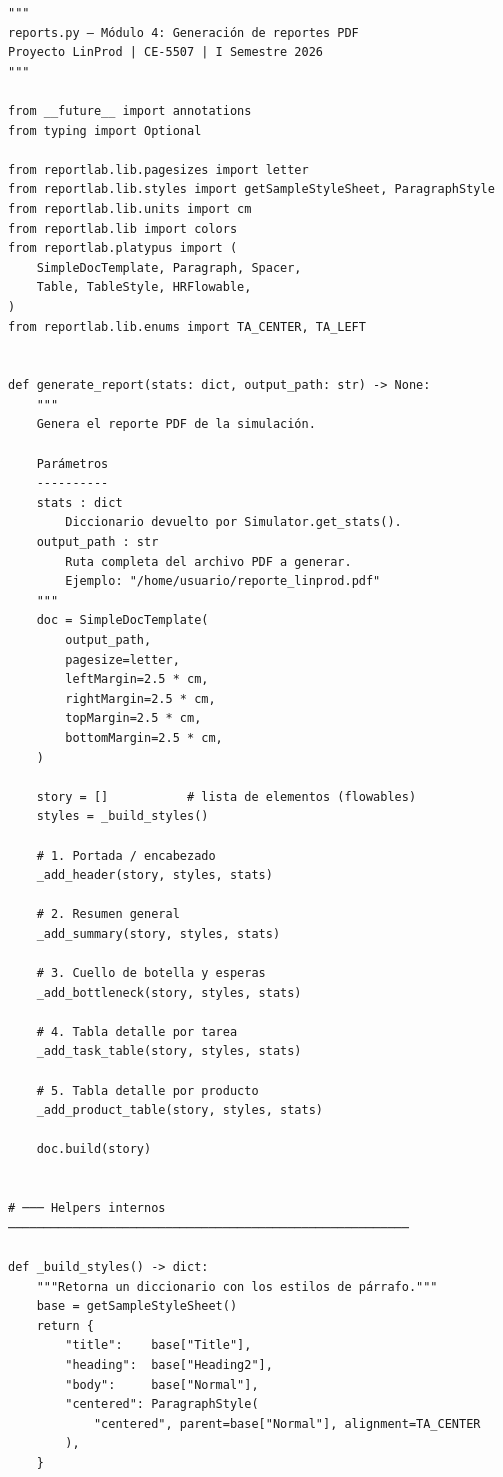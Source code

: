 \documentclass[12pt,letterpaper]{article}
\begin{document}
\begin{lstlisting}
"""
reports.py — Módulo 4: Generación de reportes PDF
Proyecto LinProd | CE-5507 | I Semestre 2026
"""

from __future__ import annotations
from typing import Optional

from reportlab.lib.pagesizes import letter
from reportlab.lib.styles import getSampleStyleSheet, ParagraphStyle
from reportlab.lib.units import cm
from reportlab.lib import colors
from reportlab.platypus import (
    SimpleDocTemplate, Paragraph, Spacer,
    Table, TableStyle, HRFlowable,
)
from reportlab.lib.enums import TA_CENTER, TA_LEFT


def generate_report(stats: dict, output_path: str) -> None:
    """
    Genera el reporte PDF de la simulación.

    Parámetros
    ----------
    stats : dict
        Diccionario devuelto por Simulator.get_stats().
    output_path : str
        Ruta completa del archivo PDF a generar.
        Ejemplo: "/home/usuario/reporte_linprod.pdf"
    """
    doc = SimpleDocTemplate(
        output_path,
        pagesize=letter,
        leftMargin=2.5 * cm,
        rightMargin=2.5 * cm,
        topMargin=2.5 * cm,
        bottomMargin=2.5 * cm,
    )

    story = []           # lista de elementos (flowables)
    styles = _build_styles()

    # 1. Portada / encabezado
    _add_header(story, styles, stats)

    # 2. Resumen general
    _add_summary(story, styles, stats)

    # 3. Cuello de botella y esperas
    _add_bottleneck(story, styles, stats)

    # 4. Tabla detalle por tarea
    _add_task_table(story, styles, stats)

    # 5. Tabla detalle por producto
    _add_product_table(story, styles, stats)

    doc.build(story)


# ─── Helpers internos ────────────────────────────────────────────────────────

def _build_styles() -> dict:
    """Retorna un diccionario con los estilos de párrafo."""
    base = getSampleStyleSheet()
    return {
        "title":    base["Title"],
        "heading":  base["Heading2"],
        "body":     base["Normal"],
        "centered": ParagraphStyle(
            "centered", parent=base["Normal"], alignment=TA_CENTER
        ),
    }
\end{lstlisting}
\end{document}

